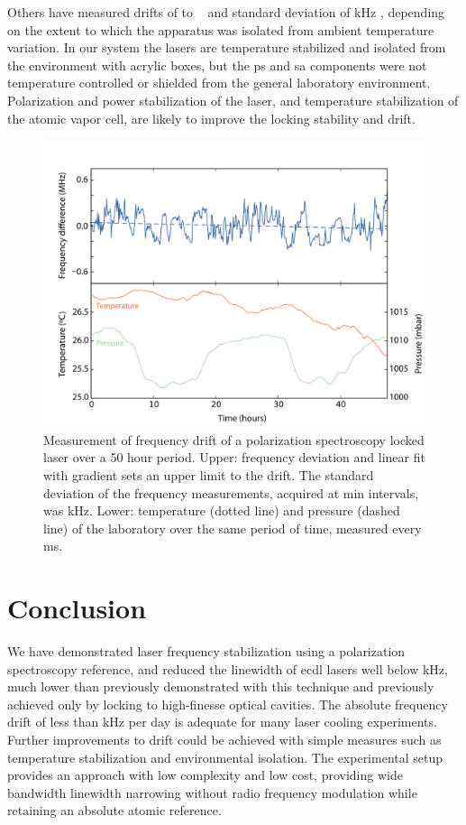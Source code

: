 Others have measured drifts of  to ~\cite{yoshikawa_frequency_2003, tiwari_laser_2006} and standard deviation of \unit[400]{kHz} \cite{lee_frequency_2014}, depending on the extent to which the apparatus was isolated from ambient temperature variation.
In our system the lasers are temperature stabilized and isolated from the environment with acrylic boxes, but the \gls*{ps} and \gls*{sa} components were not temperature controlled or shielded from the general laboratory environment.
Polarization and power stabilization of the laser, and temperature stabilization of the atomic vapor cell, are likely to improve the locking stability and drift.

\begin{figure}[htbp]
\centering
\includegraphics[width=\linewidth]{part1/Figs/fig6_v1.pdf}
\caption{Measurement of frequency drift of a polarization spectroscopy locked laser over a 50 hour period.
Upper: frequency deviation and linear fit with gradient  sets an upper limit to the drift.
The standard deviation of the frequency measurements, acquired at \unit[5]{min} intervals, was \unit[155]{kHz}.
Lower: temperature (dotted line) and pressure (dashed line) of the laboratory over the same period of time, measured every \unit[200]{ms}.}
\label{drift}
\end{figure}

\section{Conclusion}
We have demonstrated laser frequency stabilization using a polarization spectroscopy reference, and reduced the linewidth of \gls*{ecdl} lasers well below \unit[1]{kHz}, much lower than previously demonstrated with this technique and previously achieved only by locking to high-finesse optical cavities.
The absolute frequency drift of less than \unit[50]{kHz} per day is adequate for many laser cooling experiments.
Further improvements to drift could be achieved with simple measures such as temperature stabilization and environmental isolation.
The experimental setup provides an approach with low complexity and low cost, providing wide bandwidth linewidth narrowing without radio frequency modulation while retaining an absolute atomic reference.

